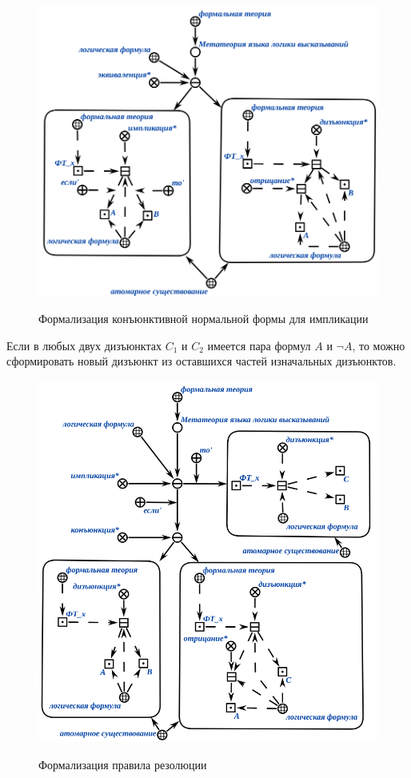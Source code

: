 \begin{figure}[H]
	\caption{Формализация конъюнктивной нормальной формы для импликации}
	\includegraphics[scale=0.6]{author/part3/figures/conjunction_implication_rule.png}
	\label{fig:conjunction_implication_rule}
\end{figure}

Если в любых двух дизъюнктах $C_1$ и $C_2$ имеется пара формул $A$ и $\neg A$, то можно сформировать новый дизъюнкт из оставшихся частей изначальных дизъюнктов.

\begin{figure}[H]
	\caption{Формализация правила резолюции}
	\includegraphics[scale=0.6]{author/part3/figures/resolution.png}
	\label{fig:resolution}
\end{figure}


